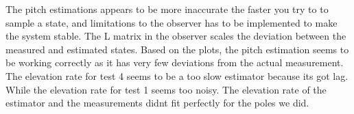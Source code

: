 \subtitle{Conclusion}

\vspace{2em}






\noindent
The pitch estimations appears to be more inaccurate the faster you try to
to sample a state, and limitations to the observer has to be implemented to
make the system stable.
The L matrix in the observer scales the deviation between the measured and
estimated states.
\noindent
Based on the plots, the pitch estimation seems to be working correctly as
it has very few deviations from the actual measurement. The elevation rate for test 4 seems to be a too slow estimator because its got lag.
While the elevation rate for test 1 seems too noisy. The elevation rate of the estimator and the measurements didnt fit perfectly for the poles we did.


